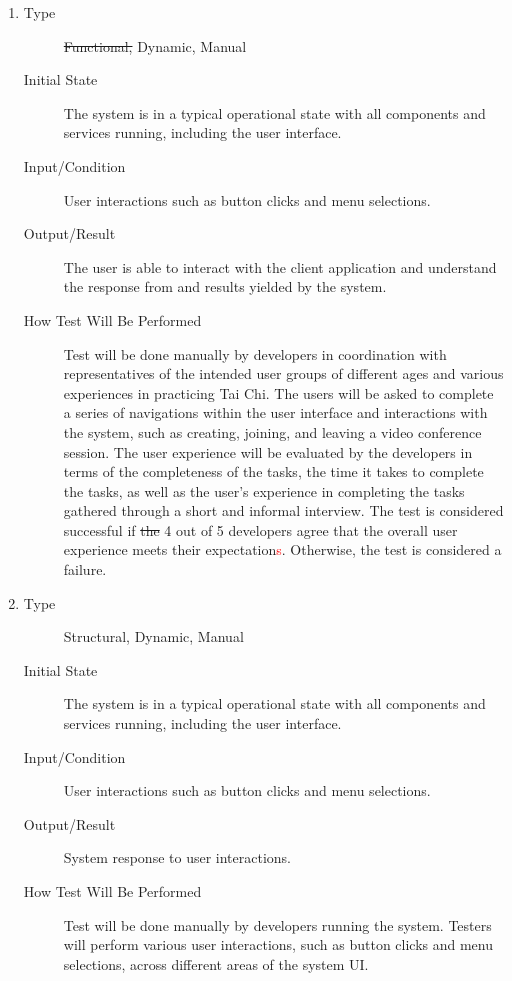 \documentclass[12pt, titlepage]{article}
\newcommand{\rt}[1]{\textcolor{red}{#1}}
\begin{document}
\begin{enumerate}[NFR-T1]
\item \label{NFRT1}
  \begin{description}
  \item[Type] \sout{Functional, }Dynamic, Manual
  \item[Initial State] The system is in a typical operational state with all
    components and services running, including the user interface.
  \item[Input/Condition] User interactions such as button clicks and menu
    selections.
  \item[Output/Result] The user is able to interact with the client application and
    understand the response from and results yielded by the system.
  \item[How Test Will Be Performed] Test will be done manually by developers in
    coordination with representatives of the intended user groups of different
    ages and various experiences in practicing Tai Chi. The users will be asked
    to complete a series of navigations within the user interface and
    interactions with the system, such as creating, joining, and leaving a video
    conference session. The user experience will be evaluated by the developers
    in terms of the completeness of the tasks, the time it takes to complete the
    tasks, as well as the user’s experience in completing the tasks gathered
    through a short and informal interview. The test is considered successful if
    \sout{the} 4 out of 5 developers agree that the overall user experience meets their
    expectation\rt{s}. Otherwise, the test is considered a failure.
  \end{description}
\item \label{NFRT2}
  \begin{description}
  \item[Type] Structural, Dynamic, Manual
  \item[Initial State] The system is in a typical operational state with all
    components and services running, including the user interface.
  \item[Input/Condition] User interactions such as button clicks and menu
    selections.
  \item[Output/Result] System response to user interactions.
  \item[How Test Will Be Performed] Test will be done manually by developers
    running the system. Testers will perform various user interactions, such as
    button clicks and menu selections, across different areas of the system UI.

\end{description}
\end{enumerate}
\end{document}
